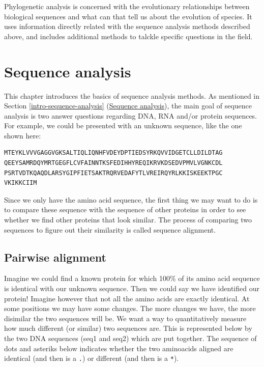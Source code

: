 \documentclass[]{book}
\theoremstyle{definition}
\theoremstyle{definition}
\theoremstyle{definition}
\theoremstyle{remark}
\begin{document}
Phylogenetic analysis is concerned with the evolutionary relationships
between biological sequences and what can that tell us about the
evolution of species. It uses information directly related with the
sequence analysis methods described above, and includes additional
methods to talckle specific questions in the field.

\chapter{Sequence analysis}\label{sequence-analysis}

This chapter introduces the basics of sequence analysis methods. As
mentioned in Section \ref{intro-sequence-analysis}
(\href{intro-sequence-analysis}{Sequence analysis}), the main goal of
sequence analysis is two answer questions regarding DNA, RNA and/or
protein sequences. For example, we could be presented with an unknown
sequence, like the one shown here:

\begin{verbatim}
MTEYKLVVVGAGGVGKSALTIQLIQNHFVDEYDPTIEDSYRKQVVIDGETCLLDILDTAG
QEEYSAMRDQYMRTGEGFLCVFAINNTKSFEDIHHYREQIKRVKDSEDVPMVLVGNKCDL
PSRTVDTKQAQDLARSYGIPFIETSAKTRQRVEDAFYTLVREIRQYRLKKISKEEKTPGC
VKIKKCIIM
\end{verbatim}

Since we only have the amino acid sequence, the first thing we may want
to do is to compare these sequence with the sequence of other proteins
in order to see whether we find other proteins that look similar. The
process of comparing two sequences to figure out their similarity is
called sequence alignment.

\section{Pairwise alignment}\label{pairwise-alignment}

Imagine we could find a known protein for which 100\% of its amino acid
sequence is identical with our unknown sequence. Then we could say we
have identified our protein! Imagine however that not all the amino
acids are exactly identical. At some positions we may have some changes.
The more changes we have, the more disimilar the two sequences will be.
We want a way to quantitatively measure how much different (or similar)
two sequences are. This is represented below by the two DNA sequences
(seq1 and seq2) which are put together. The sequence of dots and
asteriks below indicates whether the two aminoacids aligned are
identical (and then is a \texttt{.}) or different (and then is a
\texttt{*}).
\end{document}
